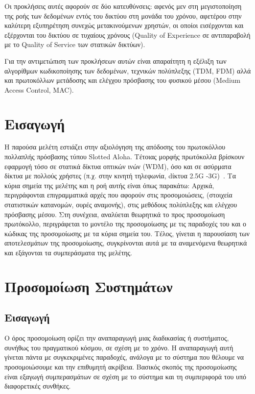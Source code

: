 \documentclass[12pt]{report}
\begin{document}
Οι προκλήσεις αυτές αφορούν σε δύο κατευθύνσεις: αφενός μεν στη μεγιστοποίηση της ροής των δεδομένων εντός του δικτύου στη μονάδα του χρόνου, αφετέρου στην καλύτερη εξυπηρέτηση συνεχώς μετακινούμενων χρηστών, οι οποίοι εισέρχονται και εξέρχονται του δικτύου σε τυχαίους χρόνους (\textlatin{Quality of Experience} σε αντιπαραβολή με το \textlatin{Quality of Service} των στατικών δικτύων).

Για την αντιμετώπιση των προκλήσεων αυτών είναι απαραίτητη η εξέλιξη των αλγορίθμων κωδικοποίησης των δεδομένων, τεχνικών πολύπλεξης (\textlatin{TDM, FDM}) αλλά και πρωτοκόλλων μετάδοσης και ελέγχου πρόσβασης του φυσικού μέσου (\textlatin{Medium Access Control, MAC}).

\section{Εισαγωγή}
Η παρούσα μελέτη εστιάζει στην αξιολόγηση της απόδοσης του πρωτοκόλλου πολλαπλής πρόσβασης τύπου \textlatin{Slotted Aloha}. Τέτοιας μορφής πρωτόκολλα βρίσκουν εφαρμογή τόσο σε στατικά δίκτυα οπτικών ινών (\textlatin{WDM}), όσο και σε ασύρματα δίκτυα με πολλούς χρήστες (π.χ. στην κινητή τηλεφωνία, dίκτυα \textlatin{2.5G -3G})~\cite{wiki:03}. Τα κύρια σημεία της μελέτης και η ροή αυτής είναι όπως παρακάτω: Αρχικά, περιγράφονται επιγραμματικά αρχές που αφορούν στις προσομοιώσεις, (στοιχεία στατιστικών κατανομών, ουρές αναμονής), στις μεθόδους πολύπλεξης και ελέγχου πρόσβασης μέσου. Στη συνέχεια, αναλύεται θεωρητικά το προς προσομοίωση πρωτόκολλο, περιγράφεται το μοντέλο της προσομοίωσης με τις παραδοχές του και ο κώδικας της προσομοίωσης με τα κύρια σημεία του. Τέλος, γίνεται η παρουσίαση των αποτελεσμάτων της προσομοίωσης, συγκρίνονται αυτά με τα αναμενόμενα θεωρητικά και εξάγονται τα συμπεράσματα της μελέτης.

\section{Προσομοίωση Συστημάτων}
\subsection{Εισαγωγή}
Ο όρος προσομοίωση ορίζει την αναπαραγωγή μιας διαδικασίας ή συστήματος, συνήθως του πραγματικού κόσμου, σε σχέση με το χρόνο. Η αναπαραγωγή αυτή γίνεται πάντα με συγκεκριμένες παραδοχές, ανάλογα με το σύστημα που θέλουμε να προσομοιώσουμε και την επιθυμητή ακρίβεια. Βασικός σκοπός της προσομοίωσης είναι εξαγωγή συμπερασμάτων σε σχέση με το σύστημα και τη συμπεριφορά του υπό διαφορετικές συνθήκες.
\end{document}

